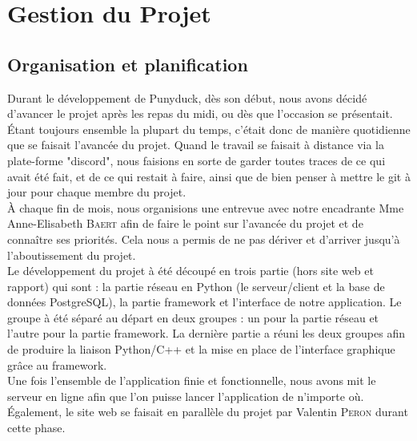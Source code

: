 \documentclass[twoside]{report}
\begin{document}
\chapter{Gestion du Projet}
\section{Organisation et planification}
Durant le développement de Punyduck, dès son début, nous avons décidé d'avancer le projet après les repas du midi,
ou dès que l'occasion se présentait. Étant toujours ensemble la plupart du temps, c'était donc de manière quotidienne que se faisait l'avancée du projet. Quand le travail se faisait à distance via la plate-forme "discord", nous faisions en sorte de garder toutes traces de ce qui avait été fait, et de ce qui restait à faire, ainsi que de bien penser à mettre le git à jour pour chaque membre du projet.\\

À chaque fin de mois, nous organisions une entrevue avec notre encadrante Mme Anne-Elisabeth \textsc{Baert} afin de faire le point sur l'avancée du projet et de connaître ses priorités. Cela nous a permis de ne pas dériver et d'arriver jusqu'à l'aboutissement du projet. \\

Le développement du projet à été découpé en trois partie (hors site web et rapport) qui sont : la partie réseau en Python (le serveur/client et la base de données PostgreSQL), la partie framework et l'interface de notre application. Le groupe à été séparé au départ en deux groupes : un pour la partie réseau et l'autre pour la partie framework. La dernière partie a réuni les deux groupes afin de produire la liaison Python/C++ et la mise en place de l'interface graphique grâce au framework. \\

Une fois l'ensemble de l'application finie et fonctionnelle, nous avons mit le serveur en ligne afin que l'on puisse lancer l'application de n'importe où. \\
Également, le site web se faisait en parallèle du projet par Valentin \textsc{Peron} durant cette phase.\\
\end{document}

